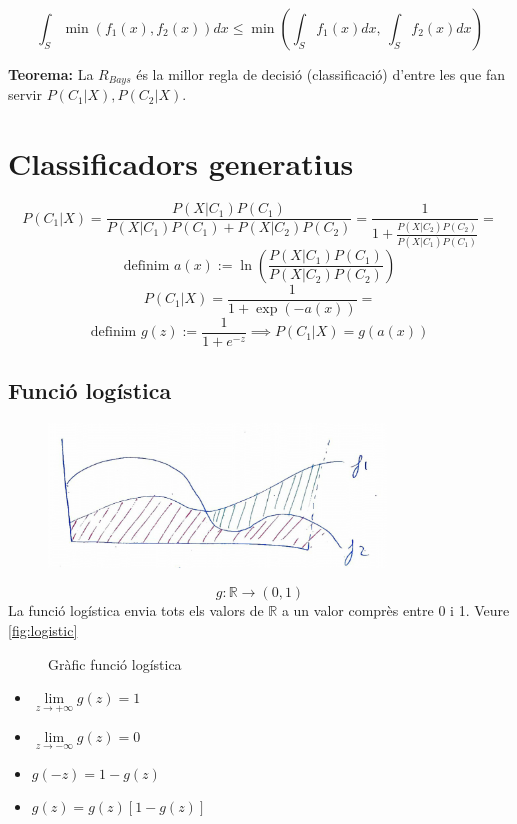 \documentclass[a4paper]{article}
\begin{document}
$$
\int_S \min(f_1(x), f_2(x)) dx \le \min\left( \int_S f_1(x) dx,\ \int_S f_2(x) dx \right)
$$

\textbf{Teorema:} La $R_{Bays}$ és la millor regla de decisió (classificació) d'entre les que fan servir $P(C_1|X), P(C_2|X)$.

\section{Classificadors generatius}

$$
P(C_1|X) = \frac{P(X|C_1)P(C_1)}{P(X|C_1)P(C_1) + P(X|C_2)P(C_2)} = 
\frac{1}{1 + \frac{P(X|C_2)P(C_2)}{P(X|C_1)P(C_1)}} =
$$
$$
\text{definim } a(x) := \ln \left( \frac{P(X|C_1)P(C_1)}{P(X|C_2)P(C_2)} \right)
$$
$$
P(C_1|X) = \frac{1}{1 + \exp(-a(x))} = 
$$
$$
\text{definim } g(z) := \frac{1}{1 + e^{-z}} \implies P(C_1|X) = g(a(x))
$$


\subsection{Funció logística}

\begin{figure}[H]
	\centering
	\includegraphics[width=0.8\textwidth]{images/tema_5-5}
\end{figure}

$$
g:\mathbb{R} \rightarrow (0,1)
$$
La funció logística envia tots els valors de $\mathbb{R}$ a un valor comprès entre 0 i 1. Veure \autoref{fig:logistic}

\begin{figure}[H]
	\centering
	\caption{Gràfic funció logística}
	\label{fig:logistic}
\end{figure}

\begin{itemize}
	\item $ \lim\limits_{z \to +\infty} g(z) = 1 $
	\item $ \lim\limits_{z \to -\infty} g(z) = 0 $
	\item $ g(-z) = 1 - g(z) $
	\item $ g(z) = g(z)[1 - g(z)] $
\end{itemize}
\end{document}

